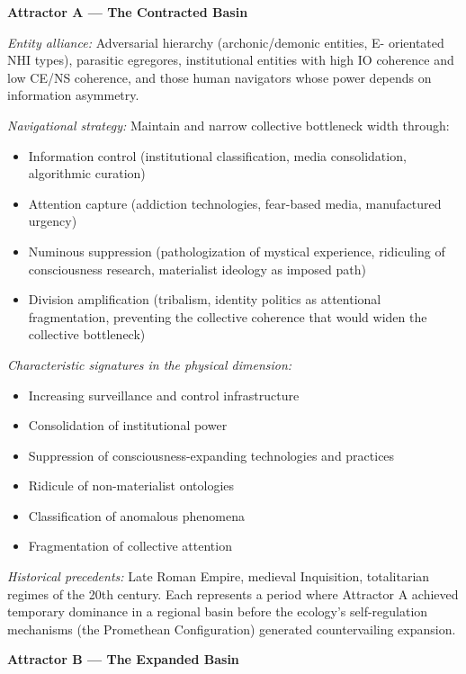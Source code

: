 \textbf{Attractor A — The Contracted Basin}


\textit{Entity alliance:} Adversarial hierarchy (archonic/demonic entities, E- orientated NHI types), parasitic egregores, institutional entities with high IO coherence and low CE/NS coherence, and those human navigators whose power depends on information asymmetry.


\textit{Navigational strategy:} Maintain and narrow collective bottleneck width through:

\begin{itemize}[nosep,leftmargin=*]
  \item Information control (institutional classification, media consolidation, algorithmic curation)
  \item Attention capture (addiction technologies, fear-based media, manufactured urgency)
  \item Numinous suppression (pathologization of mystical experience, ridiculing of consciousness research, materialist ideology as imposed path)
  \item Division amplification (tribalism, identity politics as attentional fragmentation, preventing the collective coherence that would widen the collective bottleneck)
\end{itemize}


\textit{Characteristic signatures in the physical dimension:}

\begin{itemize}[nosep,leftmargin=*]
  \item Increasing surveillance and control infrastructure
  \item Consolidation of institutional power
  \item Suppression of consciousness-expanding technologies and practices
  \item Ridicule of non-materialist ontologies
  \item Classification of anomalous phenomena
  \item Fragmentation of collective attention
\end{itemize}


\textit{Historical precedents:} Late Roman Empire, medieval Inquisition, totalitarian regimes of the 20th century. Each represents a period where Attractor A achieved temporary dominance in a regional basin before the ecology's self-regulation mechanisms (the Promethean Configuration) generated countervailing expansion.


\textbf{Attractor B — The Expanded Basin}


